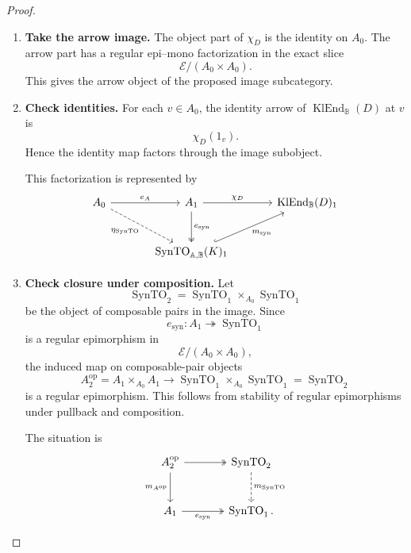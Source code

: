 \begin{proof}
    \leavevmode
    \begin{enumerate}
        \item \textbf{Take the arrow image.}
        The object part of \(\chi_D\) is the identity on \(A_0\). The arrow part
        has a regular epi--mono factorization in the exact slice
        \[
            \mathcal E/(A_0\times A_0).
        \]
        This gives the arrow object of the proposed image subcategory.

        \item \textbf{Check identities.}
        For each \(v\in A_0\), the identity arrow of
        \(\operatorname{KlEnd}_{\mathbb B}(D)\) at \(v\) is
        \[
            \chi_D(1_v).
        \]
        Hence the identity map factors through the image subobject.

        This factorization is represented by
\[
\begin{tikzcd}[column sep=large, row sep=large]
    A_0
        \arrow[r, "e_A"]
        \arrow[dr, dashed, "\eta_{\operatorname{SynTO}}"']
    &
    A_1
        \arrow[d, two heads, "e_{\mathrm{syn}}"]
        \arrow[r, "{\chi_D}"]
    &
    \operatorname{KlEnd}_{\mathbb B}(D)_1
    \\
    &
    \operatorname{SynTO}_{\mathbb A,\mathbb B}(K)_1
        \arrow[ur, hook, "{m_{\mathrm{syn}}}"']
    &
\end{tikzcd}
\]

        \item \textbf{Check closure under composition.}
        Let
        \[
            \operatorname{SynTO}_2
            =
            \operatorname{SynTO}_1
            \times_{A_0}
            \operatorname{SynTO}_1
        \]
        be the object of composable pairs in the image. Since
        \[
            e_{\mathrm{syn}}:A_1\twoheadrightarrow\operatorname{SynTO}_1
        \]
        is a regular epimorphism in
        \[
            \mathcal E/(A_0\times A_0),
        \]
        the induced map on composable-pair objects
        \[
            A^{\mathrm{op}}_2
            =
            A_1\times_{A_0}A_1
            \longrightarrow
            \operatorname{SynTO}_1\times_{A_0}\operatorname{SynTO}_1
            =
            \operatorname{SynTO}_2
        \]
        is a regular epimorphism. This follows from stability of regular
        epimorphisms under pullback and composition.

        The situation is
        \[
        \begin{tikzcd}[column sep=large, row sep=large]
            A^{\mathrm{op}}_2
                \arrow[r, two heads]
                \arrow[d, "m_{A^{\mathrm{op}}}"']
            &
            \operatorname{SynTO}_2
                \arrow[d, dashed, "m_{\operatorname{SynTO}}"]
            \\
            A_1
                \arrow[r, two heads, "e_{\mathrm{syn}}"']
            &
            \operatorname{SynTO}_1 .
        \end{tikzcd}
        \]


\end{enumerate}
\end{proof}

